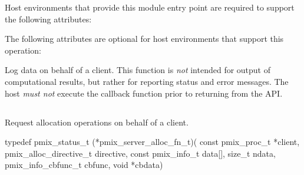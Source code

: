 
\divider

Host environments that provide this module entry point are required to support the following attributes:


\reqattrend

\optattrstart
The following attributes are optional for host environments that support this operation:


\optattrend

\descr

Log data on behalf of a client. This function is \textit{not} intended for output of computational results, but rather for reporting status and error messages. The host \emph{must not} execute the callback function prior to returning from the \ac{API}.


\subsection{}

\summary

Request allocation operations on behalf of a client.

\format

\cspecificstart
\begin{codepar}
typedef pmix_status_t (*pmix_server_alloc_fn_t)(
                             const pmix_proc_t *client,
                             pmix_alloc_directive_t directive,
                             const pmix_info_t data[], size_t ndata,
                             pmix_info_cbfunc_t cbfunc, void *cbdata)
\end{codepar}
\cspecificend

\begin{arglist}
\end{arglist}

